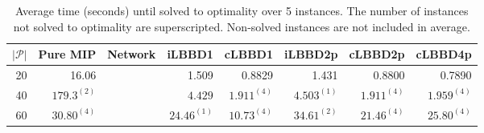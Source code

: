 \begin{table*}
    \centering
    \caption{Average time (seconds) until solved to optimality over 5 instances. The number of instances not solved to optimality are superscripted. Non-solved instances are not included in average.}
    \begin{tabular}{rrrrrrrr} \toprule
        $|\mathcal{P}|$ & Pure MIP & Network & iLBBD1 & cLBBD1 & iLBBD2p & cLBBD2p & cLBBD4p \\ \midrule
        20              & 16.06 &         & 1.509 &  0.8829 & 1.431 & 0.8800 & 0.7890 \\
        40              & $179.3^{(2)}$ &    &  $4.429$ & $1.911^{(4)}$ & $4.503^{(1)}$ & $1.911^{(4)}$ & $1.959^{(4)}$ \\
        60 & $30.80^{(4)}$ &  & $24.46^{(1)}$ & $10.73^{(4)}$ & $34.61^{(2)}$ & $21.46^{(4)}$ & $25.80^{(4)}$ \\
        \bottomrule
    \end{tabular}
\end{table*}
